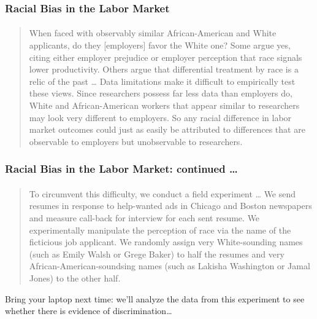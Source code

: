 \begin{frame}
  \frametitle{Racial Bias in the Labor Market}
  \framesubtitle{ \href{https://www.jstor.org/stable/3592802}{}}

  \footnotesize
  \begin{quote}
    When faced with observably similar African-American and White applicants, do they [employers] favor the White one? Some argue yes, citing either employer prejudice or employer perception that race signals lower productivity. Others argue that differential treatment by race is a relic of the past \dots 
    Data limitations make it difficult to empirically test these views. 
    \alert{Since researchers possess far less data than employers do, White and African-American workers that appear similar to researchers may look very different to employers.} 
    So any racial difference in labor market outcomes could just as easily be attributed to differences that are observable to employers but unobservable to researchers.
  \end{quote}

\end{frame}
\begin{frame}
  \frametitle{Racial Bias in the Labor Market: continued \dots}
  \framesubtitle{ \href{https://www.jstor.org/stable/3592802}{}}

  \footnotesize
  \begin{quote}
    To circumvent this difficulty, we conduct a field experiment \dots
  We send resumes in response to help-wanted ads in Chicago and Boston newspapers and measure call-back for interview for each sent resume. 
  \alert{We experimentally manipulate the perception of race via the name of the ficticious job applicant.}
    We randomly assign very White-sounding names (such as Emily Walsh or Grege Baker) to half the resumes and very African-American-soundsing names (such as Lakisha Washington or Jamal Jones) to the other half.
  \end{quote}

  \vspace{1em}
  \normalsize
  \alert{Bring your laptop next time: we'll analyze the data from this experiment to see whether there is evidence of discrimination\dots}

\end{frame}
